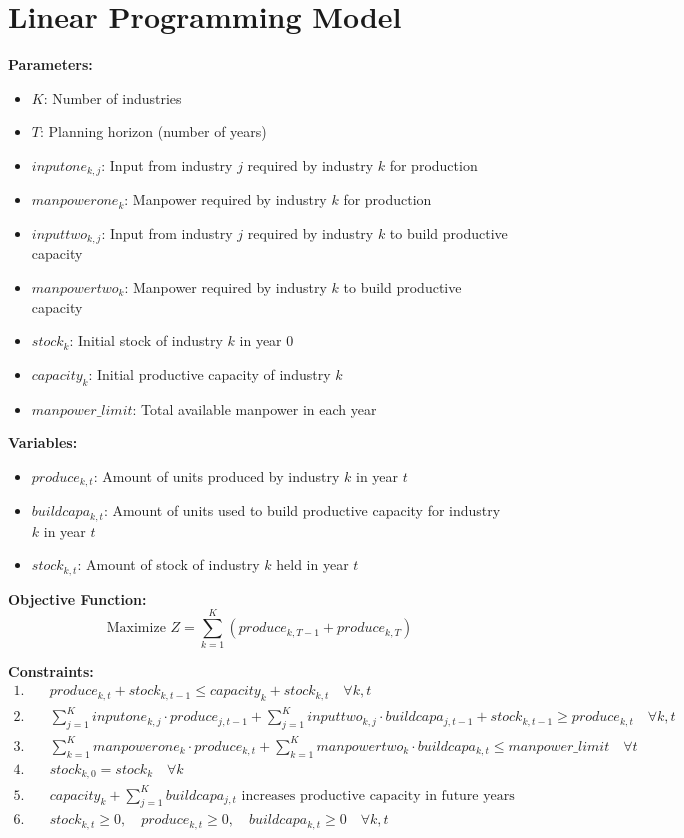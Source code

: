 \documentclass{article}
\begin{document}
\section*{Linear Programming Model}

\textbf{Parameters:}
\begin{itemize}
    \item $K$: Number of industries
    \item $T$: Planning horizon (number of years)
    \item $inputone_{k,j}$: Input from industry $j$ required by industry $k$ for production
    \item $manpowerone_k$: Manpower required by industry $k$ for production
    \item $inputtwo_{k,j}$: Input from industry $j$ required by industry $k$ to build productive capacity
    \item $manpowertwo_k$: Manpower required by industry $k$ to build productive capacity
    \item $stock_k$: Initial stock of industry $k$ in year 0
    \item $capacity_k$: Initial productive capacity of industry $k$
    \item $manpower\_limit$: Total available manpower in each year
\end{itemize}

\textbf{Variables:}
\begin{itemize}
    \item $produce_{k,t}$: Amount of units produced by industry $k$ in year $t$
    \item $buildcapa_{k,t}$: Amount of units used to build productive capacity for industry $k$ in year $t$
    \item $stock_{k,t}$: Amount of stock of industry $k$ held in year $t$
\end{itemize}

\textbf{Objective Function:}
\[
\text{Maximize } Z = \sum_{k=1}^{K} (produce_{k,T-1} + produce_{k,T})
\]

\textbf{Constraints:}
\begin{align}
1. & \quad produce_{k,t} + stock_{k,t-1} \leq capacity_k + stock_{k,t} \quad \forall k, t\\
2. & \quad \sum_{j=1}^{K} inputone_{k,j} \cdot produce_{j,t-1} + \sum_{j=1}^{K} inputtwo_{k,j} \cdot buildcapa_{j,t-1} + stock_{k,t-1} \geq produce_{k,t} \quad \forall k, t\\
3. & \quad \sum_{k=1}^{K} manpowerone_k \cdot produce_{k,t} + \sum_{k=1}^{K} manpowertwo_k \cdot buildcapa_{k,t} \leq manpower\_limit \quad \forall t\\
4. & \quad stock_{k,0} = stock_k \quad \forall k\\
5. & \quad capacity_k + \sum_{j=1}^{K} buildcapa_{j,t} \text{ increases productive capacity in future years}\\
6. & \quad stock_{k,t} \geq 0, \quad produce_{k,t} \geq 0, \quad buildcapa_{k,t} \geq 0 \quad \forall k, t
\end{align}
\end{document}
